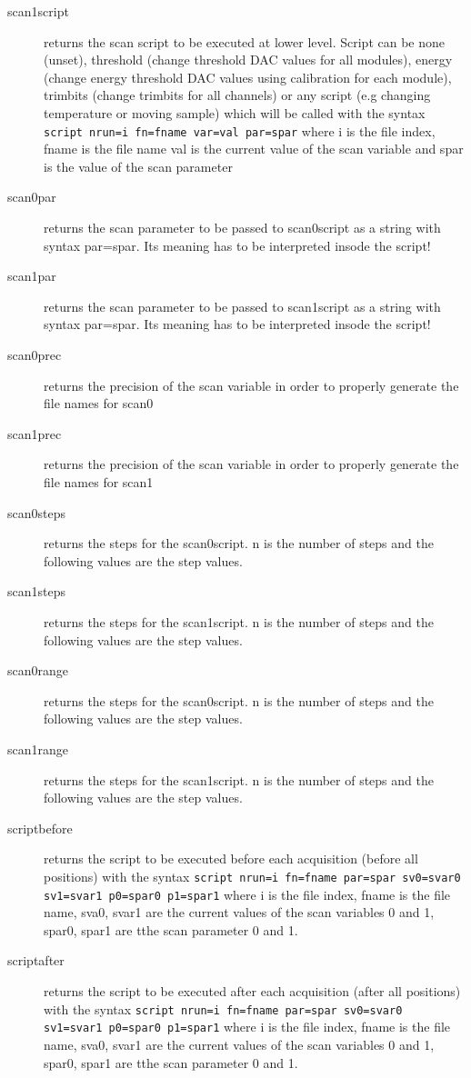 \documentclass{report}
\begin{document}
\begin{description}
\item[scan1script] returns the scan script to be executed at lower level. Script can be none (unset), threshold (change threshold DAC values for all modules), energy (change energy threshold DAC values using calibration for each module), trimbits (change trimbits for all channels) or any script (e.g changing temperature or moving sample) which will be called with the syntax \verb| script nrun=i fn=fname var=val par=spar| where i is the file index, fname is the file name val is the current value of the scan variable and spar is the value of the scan parameter
\item[scan0par] returns the scan parameter to be passed to scan0script as a string with syntax par=spar. Its meaning has to be interpreted insode the script! 
\item[scan1par] returns the scan parameter to be passed to scan1script as a string with syntax par=spar. Its meaning has to be interpreted insode the script! 
\item[scan0prec] returns the precision of the scan variable in order to properly generate the file names for scan0
\item[scan1prec] returns the precision of the scan variable in order to properly generate the file names for scan1
\item[scan0steps] returns the steps for the scan0script. n is the number of steps and the following values are the step values.
\item[scan1steps]  returns the steps for the scan1script. n is the number of steps and the following values are the step values.
\item[scan0range] returns the steps for the scan0script. n is the number of steps and the following values are the step values.
\item[scan1range]  returns the steps for the scan1script. n is the number of steps and the following values are the step values.
\item[scriptbefore] returns the script to be executed before each acquisition (before all positions) with the syntax \verb|script nrun=i fn=fname par=spar sv0=svar0 sv1=svar1 p0=spar0 p1=spar1| where i is the file index, fname is the file name, sva0, svar1 are the current values of the scan variables 0 and 1, spar0, spar1 are tthe scan parameter 0 and 1.
\item[scriptafter] returns the script to be executed after each acquisition (after all positions) with the syntax \verb|script nrun=i fn=fname par=spar sv0=svar0 sv1=svar1 p0=spar0 p1=spar1| where i is the file index, fname is the file name, sva0, svar1 are the current values of the scan variables 0 and 1, spar0, spar1 are tthe scan parameter 0 and 1.

\end{description}
\end{document}
